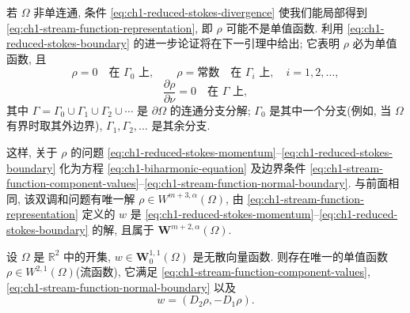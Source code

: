 \begin{Proof}
若 $\Omega$ 非单连通, 条件 \eqref{eq:ch1-reduced-stokes-divergence} 使我们能局部得到 \eqref{eq:ch1-stream-function-representation}, 即 $\rho$ 可能不是单值函数. 利用 \eqref{eq:ch1-reduced-stokes-boundary} 的进一步论证将在下一引理中给出; 它表明 $\rho$ 必为单值函数, 且
\begin{equation}
\rho=0\quad\text{在 }\Gamma_0\text{ 上},
\qquad
\rho=\text{常数}\quad\text{在 }\Gamma_i\text{ 上},\quad i=1,2,\ldots,
\label{eq:ch1-stream-function-component-values}
\end{equation}
\begin{equation}
\frac{\partial\rho}{\partial\nu}=0\quad\text{在 }\Gamma\text{ 上},
\label{eq:ch1-stream-function-normal-boundary}
\end{equation}
其中 $\Gamma=\Gamma_0\cup\Gamma_1\cup\Gamma_2\cup\cdots$ 是 $\partial\Omega$ 的连通分支分解; $\Gamma_0$ 是其中一个分支(例如, 当 $\Omega$ 有界时取其外边界), $\Gamma_1,\Gamma_2,\ldots$ 是其余分支.

这样, 关于 $\rho$ 的问题 \eqref{eq:ch1-reduced-stokes-momentum}--\eqref{eq:ch1-reduced-stokes-boundary} 化为方程 \eqref{eq:ch1-biharmonic-equation} 及边界条件 \eqref{eq:ch1-stream-function-component-values}--\eqref{eq:ch1-stream-function-normal-boundary}. 与前面相同, 该双调和问题有唯一解 $\rho\in W^{m+3,\alpha}(\Omega)$, 由 \eqref{eq:ch1-stream-function-representation} 定义的 $w$ 是 \eqref{eq:ch1-reduced-stokes-momentum}--\eqref{eq:ch1-reduced-stokes-boundary} 的解, 且属于 $\mathbf W^{m+2,\alpha}(\Omega)$.
\end{Proof}

\begin{Lemma}
\label{lem:ch1-stream-function-single-valued}
设 $\Omega$ 是 $\mathbb R^2$ 中的开集, $w\in\mathbf W_0^{1,1}(\Omega)$ 是无散向量函数. 则存在唯一的单值函数 $\rho\in W^{2,1}(\Omega)$(流函数), 它满足 \eqref{eq:ch1-stream-function-component-values}, \eqref{eq:ch1-stream-function-normal-boundary} 以及
\begin{equation}
w=(D_2\rho,-D_1\rho).
\label{eq:ch1-stream-function-lemma-representation}
\end{equation}
\end{Lemma}

